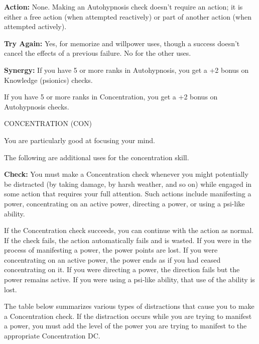 \documentclass{article}
\begin{document}
\textbf{Action:} None. Making an Autohypnosis check doesn't require an action; 
it is either a free action (when attempted reactively) or part of another action 
(when attempted actively).

\textbf{Try Again: }Yes, for memorize and willpower uses, though a success doesn't 
cancel the effects of a previous failure. No for the other uses.

\textbf{Synergy: }If you have 5 or more ranks in Autohypnosis, you get a +2 bonus 
on Knowledge (psionics) checks.

If you have 5 or more ranks in Concentration, you get a +2 bonus on Autohypnosis 
checks.

\vspace{12pt}
CONCENTRATION{\large{} }(CON)

You are particularly good at focusing your mind. 

The following are additional uses for the concentration skill.

\textbf{Check:} You must make a Concentration check whenever you might potentially 
be distracted (by taking damage, by harsh weather, and so on) while engaged in 
some action that requires your full attention. Such actions include manifesting 
a power, concentrating on an active power, directing a power, or using a psi-like 
ability.

If the Concentration check succeeds, you can continue with the action as normal. 
If the check fails, the action automatically fails and is wasted. If you were in 
the process of manifesting a power, the power points are lost. If you were concentrating 
on an active power, the power ends as if you had ceased concentrating on it. If 
you were directing a power, the direction fails but the power remains active. If 
you were using a psi-like ability, that use of the ability is lost.

The table below summarizes various types of distractions that cause you to make 
a Concentration check. If the distraction occurs while you are trying to manifest 
a power, you must add the level of the power you are trying to manifest to the 
appropriate Concentration DC.
\end{document}
